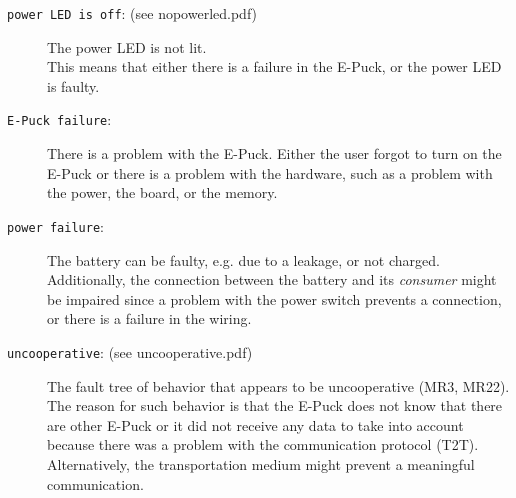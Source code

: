 \documentclass[a4paper,parskip,headheight=38pt]{scrartcl} %
\begin{document}
\begin{description}
\item[\texttt{power LED is off}: (see nopowerled.pdf)]
    The power LED is not lit. \\
    This means that either there is a failure in the E-Puck, or the power LED is faulty.
\item[\texttt{E-Puck failure}:]
    There is a problem with the E-Puck. 
    Either the user forgot to turn on the E-Puck or there is a problem with the hardware, such as a problem with the power, the board, or the memory.
\item[\texttt{power failure}:]
    The battery can be faulty, e.g. due to a leakage, or not charged. Additionally, the connection between the battery and its \textit{consumer} might be impaired since a problem with the power switch prevents a connection, or there is a failure in the wiring.
\item[\texttt{uncooperative}: (see uncooperative.pdf)]
    The fault tree of behavior that appears to be uncooperative (MR3, MR22). \\
    The reason for such behavior is that the E-Puck does not know that there are other E-Puck or it did not receive any data to take into account because there was a problem with the communication protocol (T2T). 
    Alternatively, the transportation medium might prevent a meaningful communication.


\end{description}
\end{document}

